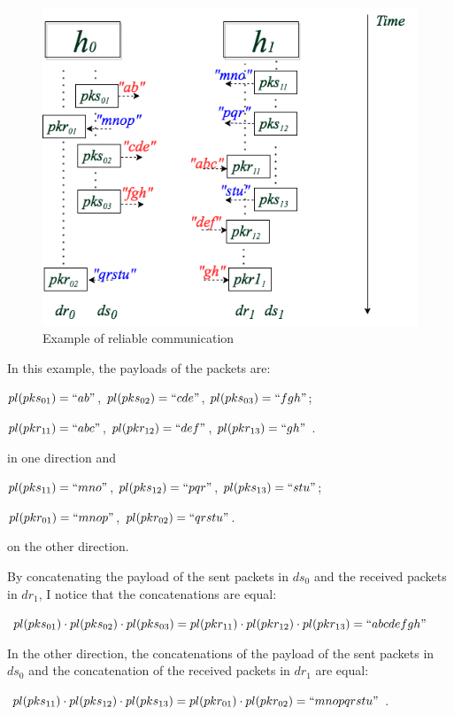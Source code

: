 \begin{figure}[H]
\centerline{\includegraphics[scale=0.5]{Figures/reliableexample}}
\caption{Example of reliable communication}
\label{reliableexample}
\end{figure}

In this example, the payloads of the packets are:

$pl(pks_{01})=``ab"$, $ pl(pks_{02})=``cde"$, $pl(pks_{03})=``fgh"$;

$pl(pkr_{11})=``abc"$, $pl(pkr_{12})=``def"$, $pl(pkr_{13})=``gh"$ .

in one direction and 

$pl(pks_{11})=``mno"$, $pl(pks_{12})=``pqr"$, $pl(pks_{13})=``stu"$;

$pl(pkr_{01})=``mnop"$, $pl(pkr_{02})=``qrstu"$. 

on the other direction. 

By concatenating the payload of the sent packets in $ds_0$ and the received packets in $dr_1$, I notice that the concatenations are equal: 

$pl(pks_{01}) \cdot pl(pks_{02}) \cdot pl(pks_{03}) = pl(pkr_{11}) \cdot pl(pkr_{12}) \cdot pl(pkr_{13}) = ``abcdefgh"$ 

In the other direction, the concatenations of the payload of the sent packets in $ds_0$ and the concatenation of the received packets in $dr_1$ are equal:

$pl(pks_{11}) \cdot pl(pks_{12}) \cdot pl(pks_{13}) = pl(pkr_{01}) \cdot pl(pkr_{02}) = ``mnopqrstu"$. 

